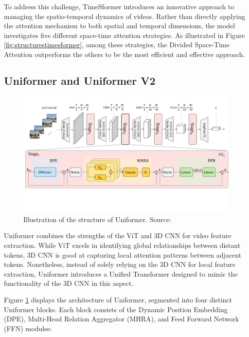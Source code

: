 To address this challenge, TimeSformer introduces an innovative approach to managing the spatio-temporal dynamics of videos. Rather than directly applying the attention mechanism to both spatial and temporal dimensions, the model investigates five different space-time attention strategies. As illustrated in Figure \ref{fig:structurestimesformer}, among these strategies, the Divided Space-Time Attention outperforms the others to be the most efficient and effective approach.


\subsection{Uniformer and Uniformer V2}
\begin{figure}[ht]
    \centering
    \includegraphics[width=1.0\textwidth]{assets/charts_rw/Uniformer}
    \caption[The Structure of Uniformer]{Illustration of the structure of Uniformer. Source: \parencite{li2022uniformer}}
    \label{fig:structureuniformer}
\end{figure}

Uniformer combines the strengths of the ViT and 3D CNN for video feature extraction. While ViT excels in identifying global relationships between distant tokens, 3D CNN is good at capturing local attention patterns between adjacent tokens. Nonetheless, instead of solely relying on the 3D CNN for local feature extraction, Uniformer introduces a Unified Transformer designed to mimic the functionality of the 3D CNN in this aspect.

Figure \ref{fig:structureuniformer} displays the architecture of Uniformer, segmented into four distinct Uniformer blocks. Each block consists of the Dynamic Position Embedding (DPE), Multi-Head Relation Aggregator (MHRA), and Feed Forward Network (FFN) modules:

